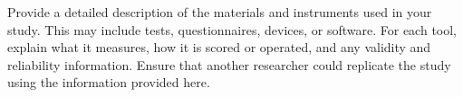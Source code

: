 Provide a detailed description of the materials and instruments used in your study. This may include tests, questionnaires, devices, or software. For each tool, explain what it measures, how it is scored or operated, and any validity and reliability information. Ensure that another researcher could replicate the study using the information provided here.